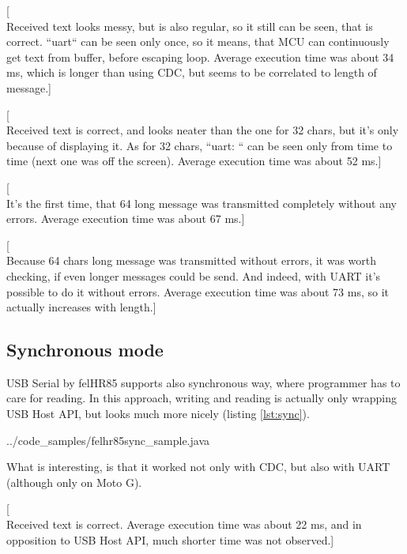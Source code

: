 [\\Received text looks messy, but is also regular, so it still can be seen,
that is correct. ``uart`` can be seen only once, so it means, that MCU can
continuously get text from buffer, before escaping loop.
Average execution time was about 34 ms, which is longer than using CDC, but
seems to be correlated to length of message.]

[\\Received text is correct, and looks neater than the one for 32 chars, but
it's only because of displaying it. 
As for 32 chars, ``uart: `` can be seen only from time to time (next one was
off the screen).
Average execution time was about 52 ms.]

[\\It's the first time, that 64 long message was transmitted completely without
any errors.
Average execution time was about 67 ms.]

[\\Because 64 chars long message was transmitted without errors, it was worth
checking, if even longer messages could be send. 
And indeed, with UART it's possible to do it without errors.
Average execution time was about 73 ms, so it actually increases with length.]

\clearpage

\subsection{Synchronous mode}
USB Serial by felHR85 supports also synchronous way, where programmer has to
care for reading.
In this approach, writing and reading is actually only wrapping USB Host API,
but looks much more nicely (listing \ref{lst:sync}).

{../code_samples/felhr85sync_sample.java}

What is interesting, is that it worked not only with CDC, but also with UART
(although only on Moto G).

[\\Received text is correct.
Average execution time was about 22 ms, and in opposition to USB Host API, much
shorter time was not observed.]

